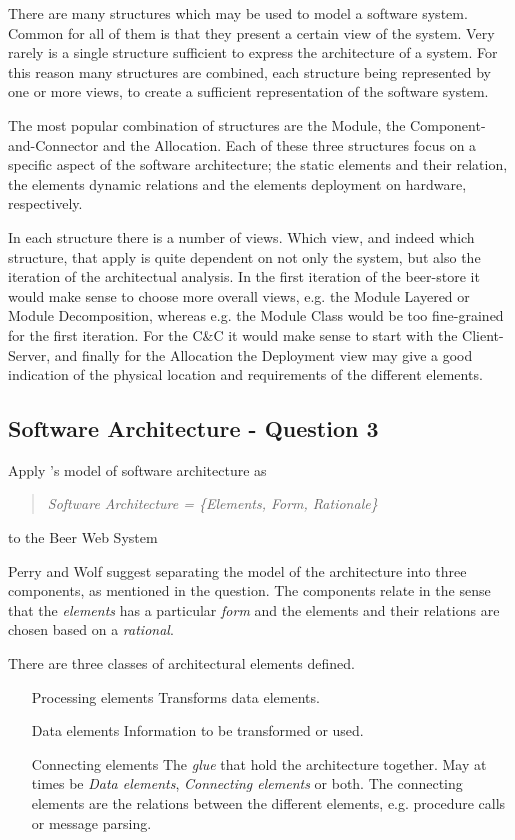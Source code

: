 There are many structures which may be used to model a software system. Common for all of them is that they present a certain view of the system. Very rarely is a single structure sufficient to express the architecture of a system. For this reason many structures are combined, each structure being represented by one or more views, to create a sufficient representation of the software system.

The most popular combination of structures are the Module, the Component-and-Connector and the Allocation. Each of these three structures focus on a specific aspect of the software architecture; the static elements and their relation, the elements dynamic relations and the elements deployment on hardware, respectively. 

In each structure there is a number of views. Which view, and indeed which structure, that apply is quite dependent on not only the system, but also the iteration of the architectual analysis. In the first iteration of the beer-store it would make sense to choose more overall views, e.g. the Module Layered or Module Decomposition, whereas e.g. the Module Class would be too fine-grained for the first iteration. For the C\&C it would make sense to start with the Client-Server, and finally for the Allocation the Deployment view may give a good indication of the physical location and requirements of the different elements.

\subsection{Software Architecture - Question 3}

\begin{question}
Apply \cite{perrywolf1992}'s model of software architecture as
\begin{quote}
	{\it Software Architecture = \{Elements, Form, Rationale\}}
\end{quote}
to the Beer Web System
\end{question}

Perry and Wolf suggest separating the model of the architecture into three components, as mentioned in the question. The components relate in the sense that the \emph{elements} has a particular \emph{form} and the elements and their relations are chosen based on a \emph{rational}.

There are three classes of architectural elements defined.
\begin{itemize}
    \item[Processing elements] Transforms data elements.
    \item[Data elements] Information to be transformed or used.
    \item[Connecting elements] The \emph{glue} that hold the architecture together. May at times be \emph{Data elements}, \emph{Connecting elements} or both. The connecting elements are the relations between the different elements, e.g. procedure calls or message parsing.
\end{itemize}


